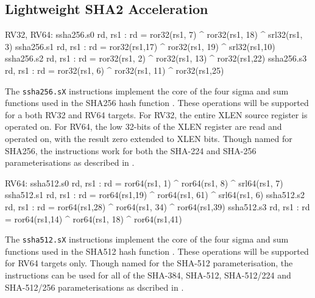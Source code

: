 \todo{}


\subsection{Lightweight SHA2 Acceleration}

\begin{isa}
RV32, RV64:
    ssha256.s0 rd, rs1 : rd = ror32(rs1, 7) ^ ror32(rs1, 18) ^ srl32(rs1, 3)
    ssha256.s1 rd, rs1 : rd = ror32(rs1,17) ^ ror32(rs1, 19) ^ srl32(rs1,10)
    ssha256.s2 rd, rs1 : rd = ror32(rs1, 2) ^ ror32(rs1, 13) ^ ror32(rs1,22)
    ssha256.s3 rd, rs1 : rd = ror32(rs1, 6) ^ ror32(rs1, 11) ^ ror32(rs1,25)
\end{isa}

The {\tt ssha256.sX}
instructions implement the core of the four sigma and sum functions used in
the SHA256 hash function \cite[Section 4.1.2]{nist:fips:180:4}.
These operations will be supported for a both RV32 and RV64 targets.
For RV32, the entire XLEN source register is operated on.
For RV64, the low 32-bits of the XLEN register are read and operated on,
with the result zero extended to XLEN bits.
Though named for SHA256, the instructions work for both the
SHA-224 and SHA-256 parameterisations as described in
\cite{nist:fips:180:4}.


\begin{isa}
RV64:
    ssha512.s0 rd, rs1 : rd = ror64(rs1, 1) ^ ror64(rs1,  8) ^ srl64(rs1, 7)
    ssha512.s1 rd, rs1 : rd = ror64(rs1,19) ^ ror64(rs1, 61) ^ srl64(rs1, 6)
    ssha512.s2 rd, rs1 : rd = ror64(rs1,28) ^ ror64(rs1, 34) ^ ror64(rs1,39)
    ssha512.s3 rd, rs1 : rd = ror64(rs1,14) ^ ror64(rs1, 18) ^ ror64(rs1,41)
\end{isa}

The {\tt ssha512.sX}
instructions implement the core of the four sigma and sum functions used in
the SHA512 hash function \cite[Section 4.1.3]{nist:fips:180:4}.
These operations will be supported for RV64 targets only.
Though named for the SHA-512 parameterisation, the instructions
can be used for all of the SHA-384, SHA-512, SHA-512/224 and SHA-512/256
parameterisations as dscribed in \cite{nist:fips:180:4}.


